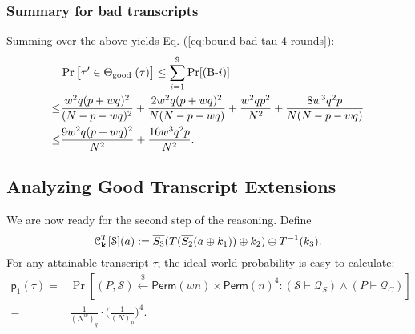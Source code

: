 \subsubsection{Summary for bad transcripts}


Summing over the above yields Eq. (\ref{eq:bound-bad-tau-4-rounds}):
%
\begin{align*}
&  \Pr\big[ \tau' \in \Theta_{\text {good }}(\tau)\big]  \leq \sum_{i=1}^{9}\Pr[\text{(B-}i)]       \\
\leq  & \frac{w^2 q (p+w q)^{2}}{(N-p-wq)^{2}}+
\frac{2w^2 q (p+w q)^{2}}{N  (N-p-wq)}+
\frac{w^2qp^2}{N^2}+
\frac{8w^3q^2p}{N(N-p-wq)}      \\
\leq  & \frac{9w^2 q (p+w q)^{2}}{N^2}+ \frac{16w^3q^2p}{N^2} .
\end{align*}
%








\subsection{Analyzing Good Transcript Extensions}
\label{sec:good-tau-4-rounds}

We are now ready for the second step of the reasoning. Define
%
$$\mathcal{C}_{\mathbf{k}}^T[\mathcal{S}](a):=   \overline{S_3}(T(\overline{S_2}(a\oplus k_1))\oplus k_2)\oplus T^{-1}(k_3).$$
%
For any attainable transcript $\tau$, the ideal world probability is easy to calculate:
%
%
\begin{align*}
\mathsf{p}_{1}(\tau)=&\operatorname{Pr}\left[(P,\mathcal{S})\stackrel{\$}{\leftarrow} {\mathsf{Perm}}(wn)\times\mathsf{Perm}(n)^4: (\mathcal{S} \vdash \mathcal{Q}_{S}) \wedge(P \vdash \mathcal{Q}_{C})  \right]		\\
=&\frac{1}{(N^w)_q}\cdot\bigg(\frac{1}{(N)_p}\bigg)^4.
\end{align*}



